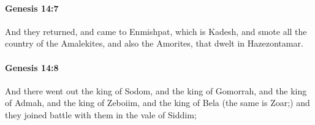 		\paragraph{Genesis 14:7} %
			\label{GENESIS-14-7}

			And they returned, and came to Enmishpat, which is Kadesh, and smote all the country of the Amalekites, and also the Amorites, that dwelt in Hazezontamar.


		\paragraph{Genesis 14:8} %
			\label{GENESIS-14-8}

			And there went out the king of Sodom, and the king of Gomorrah, and the king of Admah, and the king of Zeboiim, and the king of Bela (the same is Zoar;) and they joined battle with them in the vale of Siddim;


